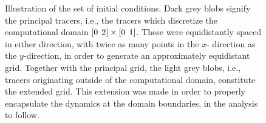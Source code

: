 \begin{figure}[htpb]
    \centering
    \def\svgwidth{0.8\linewidth}{}
    \caption[Illustration of the set of initial conditions]
        {Illustration of the set of initial conditions.
                Dark grey blobs signify the principal tracers, i.e., the tracers
                which discretize the computational domain
            $[0\hspace{1ex}2]\times[0\hspace{1ex}1]$. These were equidistantly
        spaced in either direction, with twice as many points in the $x$-
        direction as the $y$-direction, in order to generate an approximately
        equidistant grid. Together with the principal grid, the light grey
        blobs, i.e., tracers originating outside of the computational domain,
        constitute the extended grid. This extension was made in order to
        properly encapsulate the dynamics at the domain boundaries, in the
    analysis to follow.}
    \label{fig:initialgrid}
\end{figure}

